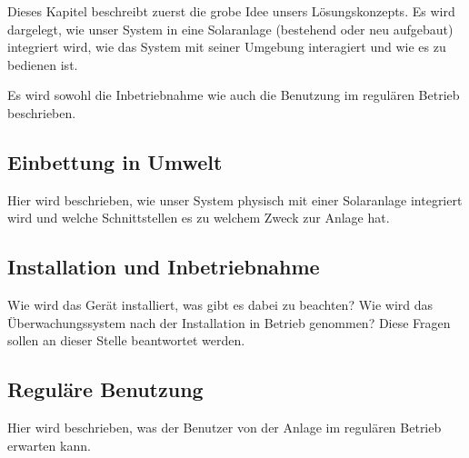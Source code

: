 Dieses Kapitel  beschreibt zuerst die grobe  Idee unsers L\"osungskonzepts. Es
wird  dargelegt, wie  unser System  in  eine Solaranlage  (bestehend oder  neu
aufgebaut) integriert wird, wie das System mit seiner Umgebung interagiert und
wie es zu bedienen ist.

Es  wird sowohl  die  Inbetriebnahme  wie auch  die  Benutzung im  regul\"aren
Betrieb beschrieben.


\subsection{Einbettung in Umwelt}
\label{subsec:einbettung}

Hier  wird  beschrieben,  wie  unser System  physisch  mit  einer  Solaranlage
integriert wird und welche Schnittstellen es zu welchem Zweck zur Anlage hat.


\subsection{Installation und Inbetriebnahme}
\label{subsec:installation}

Wie wird das Ger\"at installiert, was  gibt es dabei zu beachten? Wie wird das
\"Uberwachungssystem nach  der Installation in Betrieb  genommen? Diese Fragen
sollen an dieser Stelle beantwortet werden.


\subsection{Regul\"are Benutzung}
\label{subsec:regular}

Hier wird beschrieben, was der Benutzer  von der Anlage im regul\"aren Betrieb
erwarten kann.
